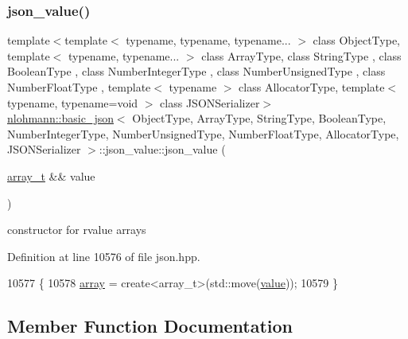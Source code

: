 \subsubsection{\texorpdfstring{json\+\_\+value()}{json\_value()}\hspace{0.1cm}{\footnotesize\ttfamily [12/12]}}
{\footnotesize\ttfamily template$<$template$<$ typename, typename, typename... $>$ class Object\+Type, template$<$ typename, typename... $>$ class Array\+Type, class String\+Type , class Boolean\+Type , class Number\+Integer\+Type , class Number\+Unsigned\+Type , class Number\+Float\+Type , template$<$ typename $>$ class Allocator\+Type, template$<$ typename, typename=void $>$ class J\+S\+O\+N\+Serializer$>$ \\
\hyperlink{classnlohmann_1_1basic__json}{nlohmann\+::basic\+\_\+json}$<$ Object\+Type, Array\+Type, String\+Type, Boolean\+Type, Number\+Integer\+Type, Number\+Unsigned\+Type, Number\+Float\+Type, Allocator\+Type, J\+S\+O\+N\+Serializer $>$\+::json\+\_\+value\+::json\+\_\+value (\begin{DoxyParamCaption}\item[{\hyperlink{classnlohmann_1_1basic__json_ae095578e03df97c5b3991787f1056374}{array\+\_\+t} \&\&}]{value }\end{DoxyParamCaption})\hspace{0.3cm}{\ttfamily [inline]}}



constructor for rvalue arrays 



Definition at line 10576 of file json.\+hpp.


\begin{DoxyCode}
10577         \{
10578             \hyperlink{unionnlohmann_1_1basic__json_1_1json__value_a7947687f3ae1911d6e9847e2b3226157}{array} = create<array\_t>(std::move(\hyperlink{classnlohmann_1_1basic__json_adcf8ca5079f5db993820bf50036bf45d}{value}));
10579         \}
\end{DoxyCode}


\subsection{Member Function Documentation}
\mbox{\label{unionnlohmann_1_1basic__json_1_1json__value_ad54d0055a5cbb83b7ebe9c0950afd398}} 
